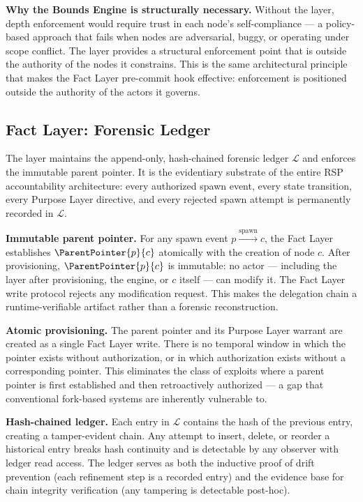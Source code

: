 \medskip
\noindent\textbf{Why the Bounds Engine is structurally necessary.}
Without the \bounds{} layer, depth enforcement would require trust in each node's self-compliance — a policy-based approach that fails when nodes are adversarial, buggy, or operating under scope conflict. The \bounds{} layer provides a structural enforcement point that is outside the authority of the nodes it constrains. This is the same architectural principle that makes the Fact Layer pre-commit hook effective: enforcement is positioned outside the authority of the actors it governs.

\subsection{Fact Layer: Forensic Ledger}
\label{sec:integration-fact}

The \fact{} layer maintains the append-only, hash-chained forensic ledger $\mathcal{L}$ and enforces the immutable parent pointer. It is the evidentiary substrate of the entire RSP accountability architecture: every authorized spawn event, every state transition, every Purpose Layer directive, and every rejected spawn attempt is permanently recorded in $\mathcal{L}$.

\medskip
\noindent\textbf{Immutable parent pointer.}
For any spawn event $p \xrightarrow{\mathrm{spawn}} c$, the Fact Layer establishes $\ParentPointer{p}{c}$ atomically with the creation of node $c$. After provisioning, $\ParentPointer{p}{c}$ is immutable: no actor — including the \purpose{} layer after provisioning, the \bounds{} engine, or $c$ itself — can modify it. The Fact Layer write protocol rejects any modification request. This makes the delegation chain a runtime-verifiable artifact rather than a forensic reconstruction.

\medskip
\noindent\textbf{Atomic provisioning.}
The parent pointer and its Purpose Layer warrant are created as a single Fact Layer write. There is no temporal window in which the pointer exists without authorization, or in which authorization exists without a corresponding pointer. This eliminates the class of exploits where a parent pointer is first established and then retroactively authorized — a gap that conventional fork-based systems are inherently vulnerable to.

\medskip
\noindent\textbf{Hash-chained ledger.}
Each entry in $\mathcal{L}$ contains the hash of the previous entry, creating a tamper-evident chain. Any attempt to insert, delete, or reorder a historical entry breaks hash continuity and is detectable by any observer with ledger read access. The ledger serves as both the inductive proof of drift prevention (each refinement step is a recorded entry) and the evidence base for chain integrity verification (any tampering is detectable post-hoc).


